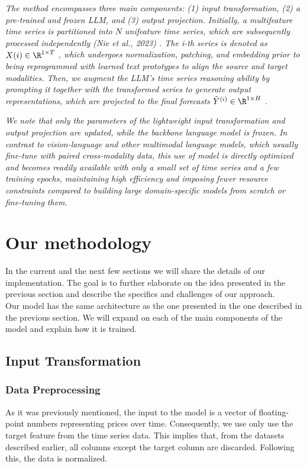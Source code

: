 \textit{The method encompasses three main components: (1) input transformation, (2) a pre-trained and frozen LLM, and (3) output projection. Initially, a multifeature time series is partitioned into \(N\) unifeature time series, which are subsequently processed independently (Nie et al., 2023) \cite{nie_et_al}.
	The i-th series is denoted as \(X(i) \in \R^{1\times T}\) , which undergoes normalization, patching, and embedding prior to being reprogrammed with learned text prototypes to align the source and target modalities.
	Then, we augment the LLM’s time series reasoning ability by prompting it together with the transformed series to generate output representations, which are projected to the final forecasts \(\hat{Y}^{(i)} \in \R^{1\times H}\) .}

\textit{We note that only the parameters of the lightweight input transformation and output projection are updated, while the backbone language model is frozen.
	In contrast to vision-language and other multimodal language models, which usually fine-tune with paired cross-modality data, this use of model is directly optimized and becomes readily available with only a small set of time series and a few  training epochs, maintaining high efficiency and imposing fewer resource constraints compared to building large domain-specific models from scratch or fine-tuning them.}

\section{Our methodology}
In the current and the next few sections we will share the details of our implementation. The goal is to further elaborate on the idea presented in the previous section and describe the specifics and challenges of our approach. \\

Our model has the same architecture as the one presented in the one described in the previous section. We will expand on each of the main components of the model and explain how it is trained. 

\subsection{Input Transformation} 

\subsubsection*{Data Preprocessing}
As it was previously mentioned, the input to the model is a vector of floating-point numbers representing prices over time. Consequently, we use only use the target feature from the time series data. This implies that, from the datasets described earlier, all columns except the target column are discarded. Following this, the data is normalized.

